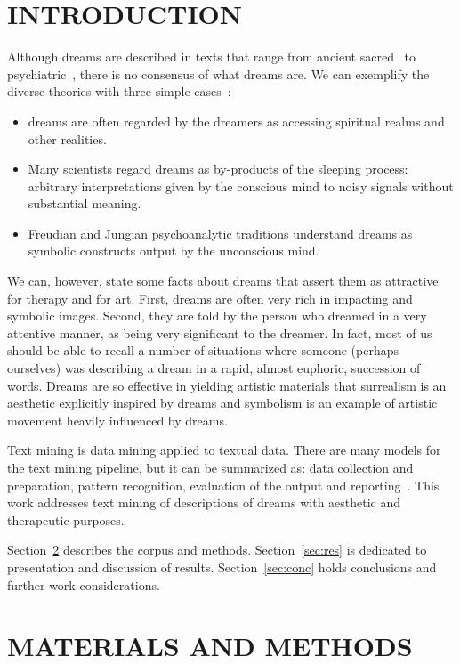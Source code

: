 \documentclass[12pt,fleqn]{article}
\begin{document}
\section{INTRODUCTION}
Although dreams are described in texts that range from ancient sacred~\citep{bible,boas,kopenawa}
to psychiatric~\citep{dreamMed}, there is no consensus of what dreams are.
% 
% 
We can exemplify the diverse theories with three simple cases~\citep{dreamsGen}:
\begin{itemize}
	\item dreams are often regarded by the dreamers as accessing spiritual realms and other realities.
	\item Many scientists regard dreams as by-products of the sleeping process:
		arbitrary interpretations given by the conscious mind to noisy signals without substantial meaning.
	\item Freudian and Jungian psychoanalytic traditions understand dreams as symbolic constructs output by the unconscious mind.
\end{itemize}
\noindent We can, however, state some facts about dreams that assert them as attractive for therapy and for art.
First, dreams are often very rich in impacting and symbolic images.
Second, they are told by the person who dreamed in a very attentive manner, as being very significant to the dreamer.
In fact, most of us should be able to recall a number of situations where someone (perhaps ourselves)
was describing a dream in a rapid, almost euphoric, succession of words.
Dreams are so effective in yielding artistic materials that surrealism is an aesthetic explicitly inspired by dreams and
symbolism is an example of artistic movement heavily influenced by dreams.

Text mining is data mining applied to textual data.
There are many models for the text mining pipeline, but
it can be summarized as: data collection and preparation,
pattern recognition, evaluation of the output and reporting~\citep{tmining}.
This work addresses text mining of descriptions of dreams
with aesthetic and therapeutic purposes.

Section~\ref{sec:matMet} describes the corpus and methods.
Section~\ref{sec:res} is dedicated to presentation and discussion of results.
Section~\ref{sec:conc} holds conclusions and further work considerations.

\section{MATERIALS AND METHODS}\label{sec:matMet}
\end{document}
